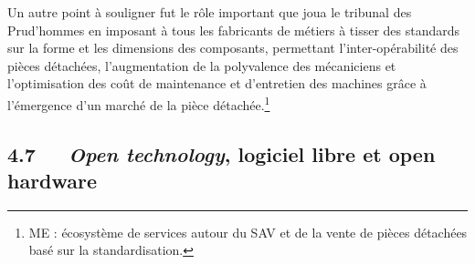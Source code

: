 \documentclass{FramateX}
\begin{document}
\begin{refsection}
Un autre point à souligner fut le rôle important que joua le tribunal
des Prud'hommes en imposant à tous les fabricants de métiers à tisser
des standards sur la forme et les dimensions des composants, permettant
l'inter-opérabilité des pièces détachées, l'augmentation de la
polyvalence des mécaniciens et l'optimisation des coût de maintenance
et d'entretien des machines grâce à l'émergence d'un marché de la pièce
détachée.\footnote{ME : écosystème de services autour du SAV et de la
vente de pièces détachées basé sur la standardisation. }

\subsection*{4.7~~~\textit{Open technology}, logiciel libre et open hardware}
{}


\end{refsection}
\end{document}
